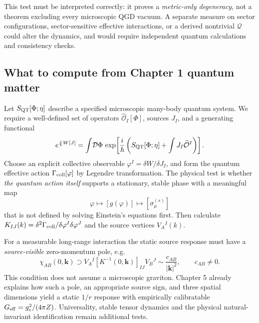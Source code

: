\documentclass[11pt,a4paper]{article}
\theoremstyle{definition}\newtheorem{definition}[theorem]{Definition}
\theoremstyle{remark}\newtheorem{remark}[theorem]{Remark}
\begin{document}
This test must be interpreted correctly: it proves a \emph{metric-only degeneracy}, not a theorem excluding every microscopic QGD vacuum. A separate measure on sector configurations, sector-sensitive effective interactions, or a derived nontrivial $\mathcal Q$ could alter the dynamics, and would require independent quantum calculations and consistency checks.

\subsection{What to compute from Chapter 1 quantum matter}
Let $S_{\rm QT}[\Phi;\eta]$ describe a specified microscopic many-body quantum system. We require a well-defined set of operators $\widehat{\mathcal O}_I[\Phi]$, sources $J_I$, and a generating functional
\begin{equation}
 e^{\frac{i}{\hbar}W[J]}=\int\!\mathcal D\Phi\,\exp\!\left[\frac{i}{\hbar}\left(S_{\rm QT}[\Phi;\eta]+\int J_I\widehat{\mathcal O}^I\right)\right].
\end{equation}
Choose an explicit collective observable $\varphi^I=\delta W/\delta J_I$, and form the quantum effective action $\Gamma_{\rm coll}[\varphi]$ by Legendre transformation. The physical test is whether \emph{the quantum action itself} supports a stationary, stable phase with a meaningful map
\begin{equation}
 \varphi\longmapsto[g(\varphi)]\longmapsto[\sigma^{(s)}_\mu]
\end{equation}
that is not defined by solving Einstein's equations first. Then calculate $K_{IJ}(k)=\delta^2\Gamma_{\rm coll}/\delta\varphi^I\delta\varphi^J$ and the source vertices $V_A{}^I(k)$.

For a measurable long-range interaction the static source response must have a \emph{source-visible} zero-momentum pole, e.g.
\begin{equation}\label{eq:response}
\chi_{AB}(0,\bm k)\supset V_A{}^I[K^{-1}(0,\bm k)]_{IJ}V_B{}^J
\sim \frac{c_{AB}}{|\bm k|^2},\qquad c_{AB}\ne0.
\end{equation}
This condition does not assume a microscopic graviton. Chapter 5 already explains how such a pole, an appropriate source sign, and three spatial dimensions yield a static $1/r$ response with empirically calibratable $G_{\rm eff}=g_c^2/(4\pi Z)$. Universality, stable tensor dynamics and the physical natural-invariant identification remain additional tests.
\end{document}
